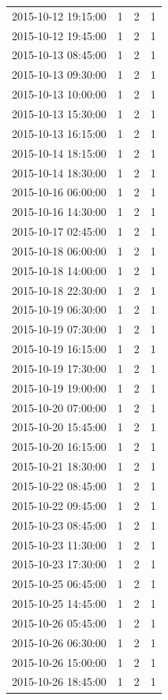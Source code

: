 \begin{tabular}{lrrr}
2015-10-12 19:15:00 & 1 & 2 & 1 \\
2015-10-12 19:45:00 & 1 & 2 & 1 \\
2015-10-13 08:45:00 & 1 & 2 & 1 \\
2015-10-13 09:30:00 & 1 & 2 & 1 \\
2015-10-13 10:00:00 & 1 & 2 & 1 \\
2015-10-13 15:30:00 & 1 & 2 & 1 \\
2015-10-13 16:15:00 & 1 & 2 & 1 \\
2015-10-14 18:15:00 & 1 & 2 & 1 \\
2015-10-14 18:30:00 & 1 & 2 & 1 \\
2015-10-16 06:00:00 & 1 & 2 & 1 \\
2015-10-16 14:30:00 & 1 & 2 & 1 \\
2015-10-17 02:45:00 & 1 & 2 & 1 \\
2015-10-18 06:00:00 & 1 & 2 & 1 \\
2015-10-18 14:00:00 & 1 & 2 & 1 \\
2015-10-18 22:30:00 & 1 & 2 & 1 \\
2015-10-19 06:30:00 & 1 & 2 & 1 \\
2015-10-19 07:30:00 & 1 & 2 & 1 \\
2015-10-19 16:15:00 & 1 & 2 & 1 \\
2015-10-19 17:30:00 & 1 & 2 & 1 \\
2015-10-19 19:00:00 & 1 & 2 & 1 \\
2015-10-20 07:00:00 & 1 & 2 & 1 \\
2015-10-20 15:45:00 & 1 & 2 & 1 \\
2015-10-20 16:15:00 & 1 & 2 & 1 \\
2015-10-21 18:30:00 & 1 & 2 & 1 \\
2015-10-22 08:45:00 & 1 & 2 & 1 \\
2015-10-22 09:45:00 & 1 & 2 & 1 \\
2015-10-23 08:45:00 & 1 & 2 & 1 \\
2015-10-23 11:30:00 & 1 & 2 & 1 \\
2015-10-23 17:30:00 & 1 & 2 & 1 \\
2015-10-25 06:45:00 & 1 & 2 & 1 \\
2015-10-25 14:45:00 & 1 & 2 & 1 \\
2015-10-26 05:45:00 & 1 & 2 & 1 \\
2015-10-26 06:30:00 & 1 & 2 & 1 \\
2015-10-26 15:00:00 & 1 & 2 & 1 \\
2015-10-26 18:45:00 & 1 & 2 & 1 \\

\end{tabular}
